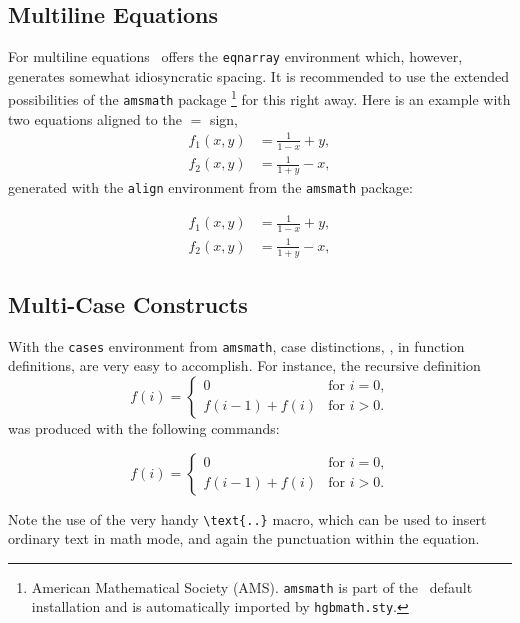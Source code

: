 \subsection{Multiline Equations}

For multiline equations \latex\ offers the \verb!eqnarray! environment which, however,
generates somewhat idiosyncratic spacing. It is recommended to use the extended
possibilities of the \texttt{amsmath} package%
\footnote{American Mathematical Society (AMS). \texttt{amsmath} is part of the 
\latex\ default installation and is automatically imported by \texttt{hgbmath.sty}.}
\cite{Mittelbach2025} for this right away. Here is an example with two equations aligned to the $=$ sign,
%
\begin{align}
	f_1 (x,y) &= \frac{1}{1-x} + y , \label{eq:f1} \\
	f_2 (x,y) &= \frac{1}{1+y} - x , \label{eq:f2}
\end{align}
%
generated with the \texttt{align} environment from the \texttt{amsmath} package:
%
\begin{LaTeXCode}[numbers=none]
\begin{align}
  f_1 (x,y) &= \frac{1}{1-x} + y , \label{eq:f1} \\
  f_2 (x,y) &= \frac{1}{1+y} - x , \label{eq:f2}
\end{align}
\end{LaTeXCode}


\subsection{Multi-Case Constructs}

With the \texttt{cases} environment from \texttt{amsmath}, case distinctions, 
\eg, in function definitions, are very easy to accomplish.
For instance, the recursive definition
%
\begin{equation}
	f(i) =
	\begin{cases}
		0             & \text{for $i = 0$,}\\
		f(i-1) + f(i) & \text{for $i > 0$.}
	\end{cases}
\end{equation}%
%
was produced with the following commands:
%
\begin{LaTeXCode}[numbers=none]
\begin{equation}
	f(i) =
	\begin{cases}
	  0             & \text{for $i = 0$,}\\
	  f(i-1) + f(i) & \text{for $i > 0$.}
	\end{cases}
\end{equation}
\end{LaTeXCode}
%
Note the use of the very handy \verb!\text{..}! macro, which can be used
to insert ordinary text in math mode, and again the punctuation within the
equation.


